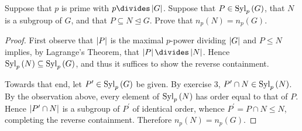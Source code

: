 \documentclass[10pt]{amsart}
\begin{document}
\begin{thm}
  Suppose that $p$ is prime with $p \divides \abs{G}$. 
  Suppose that $P \in \operatorname{Syl}_{p}\left(G\right)$, that $N$ is a subgroup of $G$, and that $P \subseteq N \unlhd G$.
  Prove that $n_p(N) = n_p(G)$.
  \begin{proof}
    First observe that $\left\lvert P \right\rvert$ is the maximal $p$-power dividing $\left\lvert G \right\rvert$ and $P \leq N$ implies, by Lagrange's Theorem, that $\abs{P} \divides \abs{N}$.
    Hence $\operatorname{Syl}_{p}\left(N\right) \subseteq \operatorname{Syl}_{p}\left(G\right)$, and thus it suffices to show the reverse containment.
    
    Towards that end, let $P^\prime \in \operatorname{Syl}_{p}\left(G\right)$ be given.
    By exercise 3, $P^\prime \cap N \in \operatorname{Syl}_{p}\left(N\right)$.
    By the observation above, every element of $\operatorname{Syl}_{p}\left(N\right)$ has order equal to that of $P$.
    Hence $\left\lvert P^\prime \cap N \right\rvert$ is a subgroup of $P^\prime$ of identical order, whence $P^\prime = P \cap N \leq N$, completing the reverse containment.
    Therefore $n_p(N) = n_p(G)$.

  \end{proof}
\end{thm}
\end{document}
